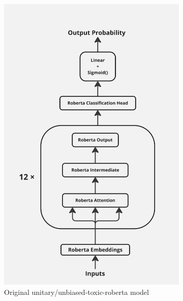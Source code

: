 \begin{figure}[t] 
    \centering
    \begin{subfigure}[h]{0.47\linewidth} 
        \centering
        \includegraphics[width=\linewidth]{Images/Screenshot_20241023_113542_Miro.jpg}
        \caption{Original unitary/unbiased-toxic-roberta model}
        \label{fig:org-model}
    \end{subfigure}
    \hspace{0.02\linewidth} %
    \begin{subfigure}[h]{0.47\linewidth} 
        \centering

\end{subfigure}
\end{figure}
